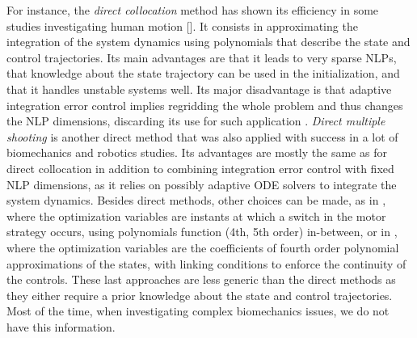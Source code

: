 For instance, the \textit{direct collocation} method has shown its efficiency in some studies investigating human motion [\addref{}]. 
It consists in approximating the integration of the system dynamics using polynomials that describe the state and control trajectories.
Its main advantages are that it leads to very sparse NLPs, that knowledge about the state trajectory can be used in the initialization, and that it handles unstable systems well. 
Its major disadvantage is that adaptive integration error control implies regridding the whole problem and thus changes the NLP dimensions, discarding its use for such application \cite{diehl2006fast}.
\textit{Direct multiple shooting} is another direct method that was also applied with success in a lot of biomechanics \cite{koschorreck2012modeling, felis2013modeling, charbonneau2020optimal, bailly2020optimal} and robotics \cite{diehl2006fast, giftthaler2018control, bailly2018mechanical} studies.
Its advantages are mostly the same as for direct collocation in addition to combining integration error control with fixed NLP dimensions, as it relies on possibly adaptive ODE solvers to integrate the system dynamics.
Besides direct methods, other choices can be made, as in \cite{yeadon2000mechanics, begon2009effect}, where the optimization variables are instants at which a switch in the motor strategy occurs, using polynomials function (4th, 5th order) in-between, or in \cite{leboeuf2006energetic, huchez2015local}, where the optimization variables are the coefficients of fourth order polynomial approximations of the states, with linking conditions to enforce the continuity of the controls. 
These last approaches are less generic than the direct methods as they either require a prior knowledge about the state and control trajectories. 
Most of the time, when investigating complex biomechanics issues, we do not have this information. 

